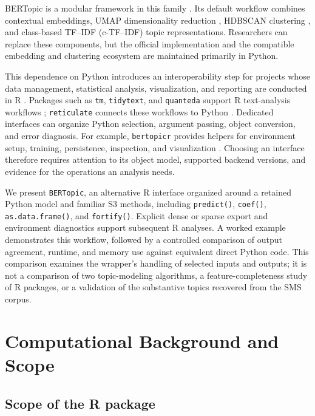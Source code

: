 \documentclass[12pt]{article}
\newcommand{\pkg}[1]{\texttt{#1}}
\newcommand{\code}[1]{\texttt{#1}}
\begin{document}
BERTopic is a modular framework in this family \citep{grootendorst2022bertopic}. Its default workflow combines contextual embeddings, UMAP dimensionality reduction \citep{mcinnes2018umap}, HDBSCAN clustering \citep{campello2013density,mcinnes2017hdbscan}, and class-based TF--IDF (c-TF--IDF) topic representations. Researchers can replace these components, but the official implementation and the compatible embedding and clustering ecosystem are maintained primarily in Python.

This dependence on Python introduces an interoperability step for projects whose data management, statistical analysis, visualization, and reporting are conducted in R \citep{rcore2026}. Packages such as \pkg{tm}, \pkg{tidytext}, and \pkg{quanteda} support R text-analysis workflows \citep{feinerer2008tm,silge2016tidytext,benoit2018quanteda}; \pkg{reticulate} connects these workflows to Python \citep{ushey2026reticulate}. Dedicated interfaces can organize Python selection, argument passing, object conversion, and error diagnosis. For example, \pkg{bertopicr} provides helpers for environment setup, training, persistence, inspection, and visualization \citep{petric2026bertopicr}. Choosing an interface therefore requires attention to its object model, supported backend versions, and evidence for the operations an analysis needs.

We present \pkg{BERTopic}, an alternative R interface organized around a retained Python model and familiar S3 methods, including \code{predict()}, \code{coef()}, \code{as.data.frame()}, and \code{fortify()}. Explicit dense or sparse export and environment diagnostics support subsequent R analyses. A worked example demonstrates this workflow, followed by a controlled comparison of output agreement, runtime, and memory use against equivalent direct Python code. This comparison examines the wrapper's handling of selected inputs and outputs; it is not a comparison of two topic-modeling algorithms, a feature-completeness study of R packages, or a validation of the substantive topics recovered from the SMS corpus.

\section{Computational Background and Scope}

\subsection{Scope of the R package}
\end{document}
